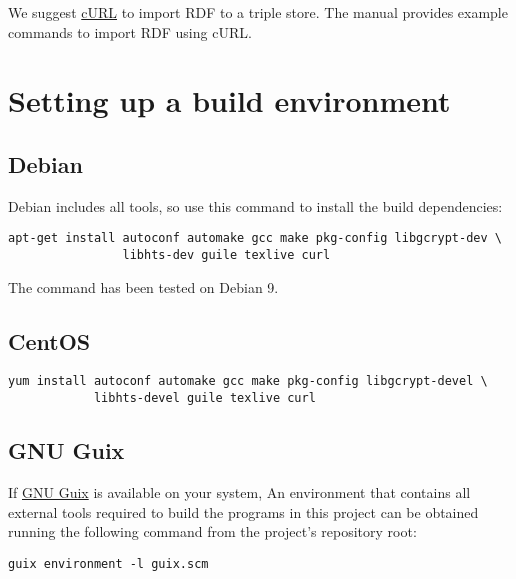   We suggest \href{https://curl.haxx.se/}{cURL} to import RDF to a triple
  store.  The manual provides example commands to import RDF using cURL.

\section{Setting up a build environment}

\subsection{Debian}

  Debian includes all tools, so use this command to install the
  build dependencies:

\begin{siderules}
\begin{verbatim}
apt-get install autoconf automake gcc make pkg-config libgcrypt-dev \
                libhts-dev guile texlive curl
\end{verbatim}
\end{siderules}

  The command has been tested on Debian 9.

\subsection{CentOS}

\begin{siderules}
\begin{verbatim}
yum install autoconf automake gcc make pkg-config libgcrypt-devel \
            libhts-devel guile texlive curl
\end{verbatim}
\end{siderules}


\subsection{GNU Guix}

  If \href{https://www.gnu.org/software/guix}{GNU Guix} is available on your
  system, An environment that contains all external tools required to build
  the programs in this project can be obtained running the following command
  from the project's repository root:

\begin{siderules}
\begin{verbatim}
guix environment -l guix.scm
\end{verbatim}
\end{siderules}

